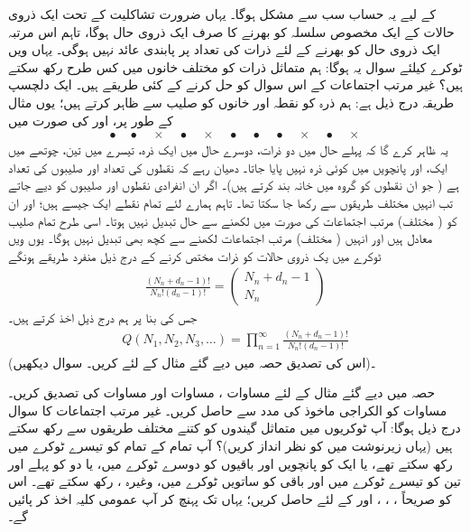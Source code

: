   کے لیے یہ حساب سب سے مشکل ہوگا۔ یہاں ضرورت تشاکلیت کے تحت ایک ذروی حالات کے  ایک مخصوص سلسلہ کو بھرنے کا صرف ایک  ذروی  حال ہوگا،  تاہم اس مرتبہ  ایک ذروی حال کو بھرنے  کے لئے  ذرات کی تعداد پر پابندی عائد نہیں ہوگی۔ یہاں  ویں  ٹوکرے کیلئے سوال یہ ہوگا:  ہم متماثل  ذرات کو  مختلف خانوں میں کس طرح رکھ سکتے ہیں؟  غیر مرتب اجتماعات کے اس سوال کو حل کرنے کے کئی طریقے ہیں۔  ایک دلچسپ طریقہ درج ذیل ہے: ہم ذرہ کو نقطہ اور خانوں کو صلیب سے ظاہر کرتے ہیں؛  یوں مثال کے طور پر،   اور  کی صورت میں
\begin{align*} 
\bullet \quad \bullet \quad \times \quad \bullet \quad \times \quad \bullet \quad \bullet \quad \bullet \quad \times \quad \bullet \quad \times
\end{align*}
یہ ظاہر کرے گا کہ پہلے حال میں دو ذرات،  دوسرے حال میں ایک ذرہ،  تیسرے میں تین، چوتھے میں ایک،  اور پانچویں میں کوئی ذرہ  نہیں پایا جاتا۔  دھیان رہے کہ نقطوں کی تعداد  اور صلیبوں کی تعداد  ہے ( جو ان نقطوں کو  گروہ میں خانہ بند کرتے ہیں)۔ اگر ان انفرادی نقطوں اور صلیبوں کو  دیے جاتے تب انہیں  مختلف طریقوں سے رکھا جا سکتا تھا۔ تاہم ہمارے لئے تمام نقطے ایک   جیسے ہیں؛  اور ان کو  ( مختلف) مرتب اجتماعات کی صورت میں لکھنے سے حال تبدیل نہیں ہوتا۔  اسی طرح تمام صلیب معادل ہیں اور انہیں (  مختلف)  مرتب اجتماعات لکھنے سے کچھ بھی تبدیل نہیں ہوگا۔ یوں  ویں  ٹوکرے  میں  یک ذروی حالات کو  ذرات مختص کرنے کے درج ذیل منفرد طریقے ہونگے 
\begin{align}\label{مساوات_متماثل_بوسن_درمیانہ_اجتماعات}
\frac{(N_n + d_n - 1) !}{N_n ! (d_n - 1) !} = 
\begin{pmatrix}
N_n + d_n - 1 \\
N_n
\end{pmatrix}
\end{align}
جس کی بنا پر ہم درج ذیل اخذ کرتے ہیں۔ 
\begin{align}\label{مساوات_متماثل_بوسن_اجتماعات}
Q(N_1 , N_2 , N_3 , \dotsc) = \prod_{n = 1}^{\infty} \frac{(N_n + d_n - 1) !}{N_n ! (d_n - 1) !}
\end{align}
(اس کی تصدیق   حصہ    میں دیے گئے مثال کے لئے   کریں۔   سوال    دیکھیں)۔


حصہ    میں دیے گئے  مثال کے لئے  مساوات  ، مساوات     اور  مساوات   کی تصدیق کریں۔ 
مساوات  کو الكراجى ماخوذ کی مدد سے حاصل کریں۔ غیر مرتب اجتماعات کا سوال درج ذیل ہوگا: آپ  ٹوکریوں میں  متماثل گیندوں کو کتنے مختلف طریقوں سے رکھ سکتے ہیں (یہاں  زیرنوشت میں  کو نظر انداز کریں)؟  آپ تمام کے تمام  کو تیسرے ٹوکرے  میں رکھ سکتے تھے،  یا ایک کو پانچویں اور باقیوں کو دوسرے  ٹوکرے  میں،  یا دو کو پہلے  اور تین کو تیسرے  ٹوکرے  میں اور باقی کو ساتویں ٹوکرے  میں، وغیرہ ،  رکھ سکتے تھے۔ اس کو صریحاً ،  ،  ،  اور  کے لئے حاصل کریں؛  یہاں تک پہنچ کر آپ عمومی کلیہ اخذ کر پائیں گے۔ 


